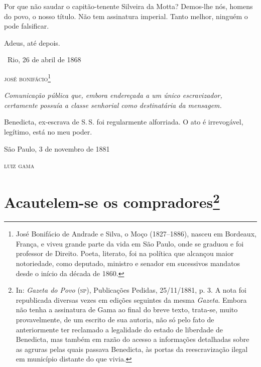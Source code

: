 {
Por que não saudar o capitão-tenente Silveira da Motta? Demos-lhe nós,
homens do povo, o nosso título. Não tem assinatura imperial. Tanto
melhor, ninguém o pode falsificar.

Adeus, até depois.\medskip

\hfill\ Rio, 26 de abril de 1868

\hfill\textsc{josé bonifácio}\footnote{José Bonifácio de Andrade e Silva, o Moço
  (1827--1886), nasceu em Bordeaux, França, e viveu grande parte da vida
  em São Paulo, onde se graduou e foi professor de Direito. Poeta,
  literato, foi na política que alcançou maior notoriedade, como
  deputado, ministro e senador em sucessivos mandatos desde o início da
  década de 1860.}



\begin{resumo}
\emph{Comunicação pública que, embora endereçada a um único
escravizador, certamente possuía a classe senhorial como destinatária da
mensagem.}
\end{resumo}

Benedicta, ex-escrava de S.\,S. foi regularmente alforriada. O ato é
irrevogável, legítimo, está no meu poder.

\medskip

\hfill São Paulo, 3 de novembro de 1881

\hfill\textsc{luiz gama}

\chapter{Acautelem-se os compradores\footnote{In: \emph{Gazeta do Povo} (\textsc{sp}), Publicações
  Pedidas, 25/11/1881, p. 3. A nota foi republicada diversas vezes em
  edições seguintes da mesma \emph{Gazeta}. Embora não tenha a
  assinatura de Gama ao final do breve texto, trata-se, muito
  provavelmente, de um escrito de sua autoria, não só pelo fato de
  anteriormente ter reclamado a legalidade do estado de liberdade de
  Benedicta, mas também em razão do acesso a informações detalhadas
  sobre as agruras pelas quais passava Benedicta, às portas da
  reescravização ilegal em município distante do que vivia.}}

}
